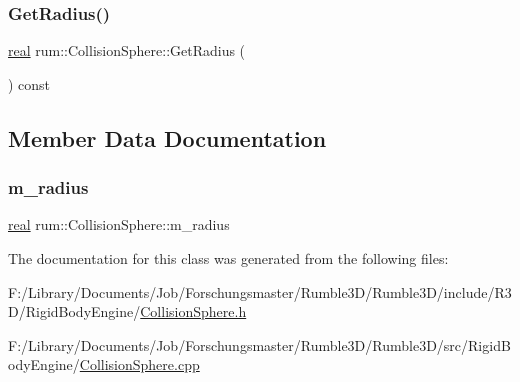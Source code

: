 \subsubsection{\texorpdfstring{Get\+Radius()}{GetRadius()}}
{\footnotesize\ttfamily \hyperlink{namespacerum_a7e8cca23573d5eaead0f138cbaa4862c}{real} rum\+::\+Collision\+Sphere\+::\+Get\+Radius (\begin{DoxyParamCaption}{ }\end{DoxyParamCaption}) const}



\subsection{Member Data Documentation}
\mbox{\label{classrum_1_1_collision_sphere_a191922b8ffb7ea87aa1caf915c563aad}} 
\subsubsection{\texorpdfstring{m\+\_\+radius}{m\_radius}}
{\footnotesize\ttfamily \hyperlink{namespacerum_a7e8cca23573d5eaead0f138cbaa4862c}{real} rum\+::\+Collision\+Sphere\+::m\+\_\+radius\hspace{0.3cm}{\ttfamily [protected]}}



The documentation for this class was generated from the following files\+:\begin{DoxyCompactItemize}
\item 
F\+:/\+Library/\+Documents/\+Job/\+Forschungsmaster/\+Rumble3\+D/\+Rumble3\+D/include/\+R3\+D/\+Rigid\+Body\+Engine/\hyperlink{_collision_sphere_8h}{Collision\+Sphere.\+h}\item 
F\+:/\+Library/\+Documents/\+Job/\+Forschungsmaster/\+Rumble3\+D/\+Rumble3\+D/src/\+Rigid\+Body\+Engine/\hyperlink{_collision_sphere_8cpp}{Collision\+Sphere.\+cpp}\end{DoxyCompactItemize}
